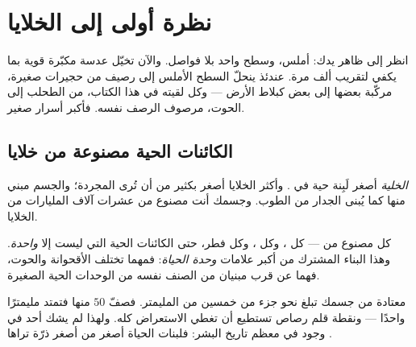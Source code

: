 \chapter{نظرة أولى إلى الخلايا}\label{ch:g5:first-look-at-cells}

انظر إلى ظاهر يدك:  أملس، وسطح واحد بلا فواصل. والآن تخيّل
عدسة مكبّرة قوية بما يكفي لتقريب ألف مرة. عندئذ ينحلّ السطح الأملس
إلى رصيف من حجيرات صغيرة، مركّبة بعضها إلى بعض كبلاط الأرض ---
وكل  لقيته في هذا الكتاب، من الطحلب إلى الحوت، مرصوف
الرصف نفسه. فأكبر أسرار  صغير.

\section{الكائنات الحية مصنوعة من خلايا}

\begin{definition}[الخلية]\label{def:g5:first-look-at-cells:cell}
\emph{الخلية} أصغر لَبِنة حية في . وأكثر
الخلايا أصغر بكثير من أن تُرى  المجردة؛ والجسم مبني منها كما
يُبنى الجدار من الطوب. وجسمك أنت مصنوع من عشرات آلاف المليارات من
الخلايا.
\end{definition}

\begin{proposition}\label{prop:g5:first-look-at-cells:principle}
كل  مصنوع من  --- كل ، وكل ، وكل فطر، حتى
الكائنات الحية التي ليست إلا  \emph{واحدة}. وهذا البناء
المشترك من أكبر علامات \emph{وحدة الحياة}:
فمهما تختلف الأقحوانة والحوت، فهما عن قرب مبنيان من الصنف نفسه من
الوحدات الحية الصغيرة.
\end{proposition}
\admitted

\begin{example}\label{ex:g5:first-look-at-cells:small}
 معتادة من  جسمك تبلغ نحو جزء من خمسين من المليمتر. فصفّ
$50$ منها فتمتد مليمترًا واحدًا --- ونقطة قلم رصاص تستطيع أن تغطي
الاستعراض كله. ولهذا لم يشك أحد في وجود  في معظم تاريخ
البشر: فلبنات الحياة أصغر من أصغر ذرّة تراها .
\end{example}

